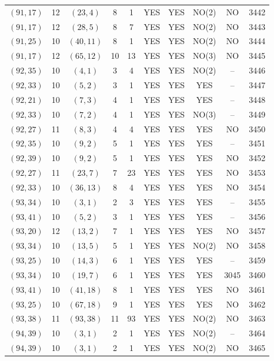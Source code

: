 \begin{longtable}{|c|c|c|c|c|c|c|c|c|c|}
$(91, 17)$ & 12 & $(23, 4)$ & 8 & 1 & YES & YES & NO(2) & NO & 3442\\
$(91, 17)$ & 12 & $(28, 5)$ & 8 & 7 & YES & YES & NO(2) & NO & 3443\\
$(91, 25)$ & 10 & $(40, 11)$ & 8 & 1 & YES & YES & NO(2) & NO & 3444\\
$(91, 17)$ & 12 & $(65, 12)$ & 10 & 13 & YES & YES & NO(3) & NO & 3445\\
$(92, 35)$ & 10 & $(4, 1)$ & 3 & 4 & YES & YES & NO(2) & -- & 3446\\
$(92, 33)$ & 10 & $(5, 2)$ & 3 & 1 & YES & YES & YES & -- & 3447\\
$(92, 21)$ & 10 & $(7, 3)$ & 4 & 1 & YES & YES & YES & -- & 3448\\
$(92, 33)$ & 10 & $(7, 2)$ & 4 & 1 & YES & YES & NO(3) & -- & 3449\\
$(92, 27)$ & 11 & $(8, 3)$ & 4 & 4 & YES & YES & YES & NO & 3450\\
$(92, 35)$ & 10 & $(9, 2)$ & 5 & 1 & YES & YES & YES & -- & 3451\\
$(92, 39)$ & 10 & $(9, 2)$ & 5 & 1 & YES & YES & YES & NO & 3452\\
$(92, 27)$ & 11 & $(23, 7)$ & 7 & 23 & YES & YES & YES & NO & 3453\\
$(92, 33)$ & 10 & $(36, 13)$ & 8 & 4 & YES & YES & YES & NO & 3454\\
$(93, 34)$ & 10 & $(3, 1)$ & 2 & 3 & YES & YES & YES & -- & 3455\\
$(93, 41)$ & 10 & $(5, 2)$ & 3 & 1 & YES & YES & YES & -- & 3456\\
$(93, 20)$ & 12 & $(13, 2)$ & 7 & 1 & YES & YES & YES & NO & 3457\\
$(93, 34)$ & 10 & $(13, 5)$ & 5 & 1 & YES & YES & NO(2) & NO & 3458\\
$(93, 25)$ & 10 & $(14, 3)$ & 6 & 1 & YES & YES & YES & -- & 3459\\
$(93, 34)$ & 10 & $(19, 7)$ & 6 & 1 & YES & YES & YES & 3045 & 3460\\
$(93, 41)$ & 10 & $(41, 18)$ & 8 & 1 & YES & YES & YES & NO & 3461\\
$(93, 25)$ & 10 & $(67, 18)$ & 9 & 1 & YES & YES & YES & NO & 3462\\
$(93, 38)$ & 11 & $(93, 38)$ & 11 & 93 & YES & YES & NO(2) & NO & 3463\\
$(94, 39)$ & 10 & $(3, 1)$ & 2 & 1 & YES & YES & NO(2) & -- & 3464\\
$(94, 39)$ & 10 & $(3, 1)$ & 2 & 1 & YES & YES & NO(2) & NO & 3465\\

\end{longtable}
